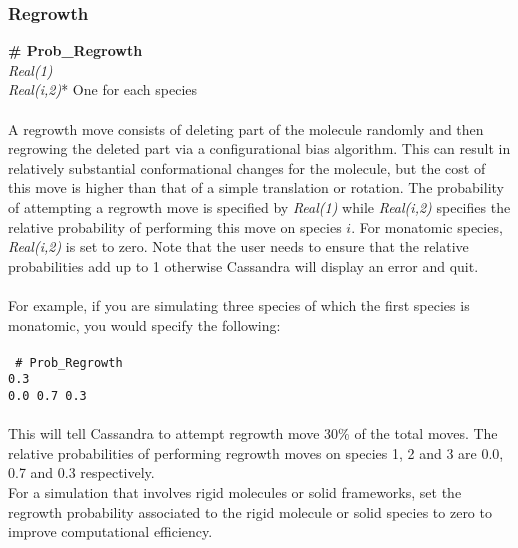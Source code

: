 \subsubsection{Regrowth}
{\bf \# Prob\_Regrowth} \\
{\it Real(1)} \\ 
{\it Real(i,2)}* One for each species \\ \\
%
A regrowth move consists of deleting part of the molecule randomly and
then regrowing the deleted part via a configurational bias algorithm.
This can result in relatively substantial conformational changes for
the molecule, but the cost of this move is higher than that of a
simple translation or rotation. The probability of attempting a
regrowth move is specified by {\it Real(1)} while {\it Real(i,2)}
specifies the relative probability of performing this move on species
$i$. For monatomic species, {\it Real(i,2)} is set to zero. Note that
the user needs to ensure that the relative probabilities add 
up to 1 otherwise Cassandra will display an error and quit. \\ \\
% 
For example, if you are simulating three species of which the first
species is monatomic, you would specify the following: \\ \\ 
%
\texttt{
\# Prob\_Regrowth \\
0.3 \\
0.0 0.7 0.3 } \\ \\
%
This will tell Cassandra to attempt regrowth move 30\% of the total moves. The relative probabilities of
performing regrowth moves on species 1, 2 and 3 are 0.0, 0.7 and 0.3 respectively.  \\

For a simulation that involves rigid molecules or solid frameworks, set the
regrowth probability associated to the rigid molecule or solid species to zero to improve computational efficiency.
%
%
